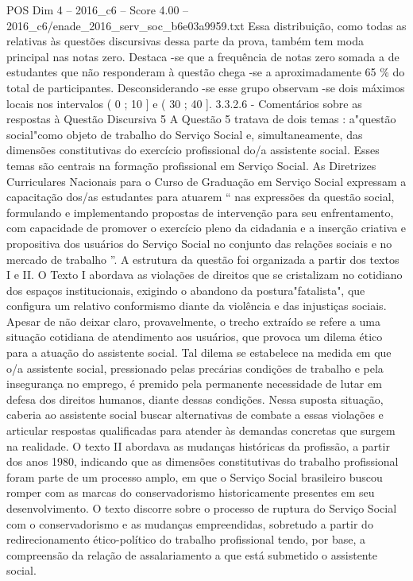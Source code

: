 \begin{textsample}{POS Dim 4 – 2016\_c6 – Score 4.00 – 2016\_c6/enade\_2016\_serv\_soc\_b6e03a9959.txt}
Essa distribuição, como todas as relativas às questões discursivas dessa parte da prova, também tem moda principal nas notas zero.
Destaca -se que a frequência de notas zero somada a de estudantes que não responderam à questão chega -se a aproximadamente 65 \% do total de participantes.
Desconsiderando -se esse grupo observam -se dois máximos locais nos intervalos ( 0 ; 10 ] e ( 30 ; 40 ]. 3.3.2.6 - Comentários sobre as respostas à Questão Discursiva 5 A Questão 5 tratava de dois temas : a"questão social"como objeto de trabalho do Serviço Social e, simultaneamente, das dimensões constitutivas do exercício profissional do/a assistente social.
Esses temas são centrais na formação profissional em Serviço Social.
As Diretrizes Curriculares Nacionais para o Curso de Graduação em Serviço Social expressam a capacitação dos/as estudantes para atuarem “ nas expressões da questão social, formulando e implementando propostas de intervenção para seu enfrentamento, com capacidade de promover o exercício pleno da cidadania e a inserção criativa e propositiva dos usuários do Serviço Social no conjunto das relações sociais e no mercado de trabalho ”.
A estrutura da questão foi organizada a partir dos textos I e II.
O Texto I abordava as violações de direitos que se cristalizam no cotidiano dos espaços institucionais, exigindo o abandono da postura"fatalista", que configura um relativo conformismo diante da violência e das injustiças sociais.
Apesar de não deixar claro, provavelmente, o trecho extraído se refere a uma situação cotidiana de atendimento aos usuários, que provoca um dilema ético para a atuação do assistente social.
Tal dilema se estabelece na medida em que o/a assistente social, pressionado pelas precárias condições de trabalho e pela insegurança no emprego, é premido pela permanente necessidade de lutar em defesa dos direitos humanos, diante dessas condições.
Nessa suposta situação, caberia ao assistente social buscar alternativas de combate a essas violações e articular respostas qualificadas para atender às demandas concretas que surgem na realidade.
O texto II abordava as mudanças históricas da profissão, a partir dos anos 1980, indicando que as dimensões constitutivas do trabalho profissional foram parte de um processo amplo, em que o Serviço Social brasileiro buscou romper com as marcas do conservadorismo historicamente presentes em seu desenvolvimento.
O texto discorre sobre o processo de ruptura do Serviço Social com o conservadorismo e as mudanças empreendidas, sobretudo a partir do redirecionamento ético-político do trabalho profissional tendo, por base, a compreensão da relação de assalariamento a que está submetido o assistente social.

\end{textsample}
